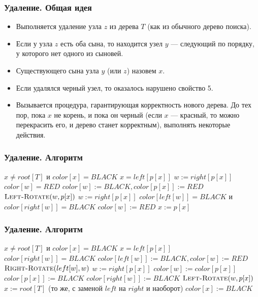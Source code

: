 \documentclass[hyperref={unicode=true}]{beamer}
\begin{document}
\frame
{
  \frametitle{Удаление. Общая идея}
  \begin{itemize}
    \item Выполняется удаление узла $z$ из дерева $T$ (как из обычного дерево поиска).
    \item Если у узла $z$ есть оба сына, то находится узел $y$ --- следующий по порядку, у которого нет одного из сыновей.
    \item Существующего сына узла $y$ (или $z$) назовем $x$.
    \item Если удалялся черный узел, то оказалось нарушено свойство 5.
    \item Вызывается процедура, гарантирующая корректность нового дерева. До тех пор, пока $x$ не корень, и пока он черный (если $x$ --- красный, то можно перекрасить его, и дерево станет корректным), выполнять некоторые действия.
  \end{itemize}
}

\frame
{
  \frametitle{Удаление. Алгоритм}
  \begin{codebox}
      \li \While $x \ne root[T]$ и $color[x] = BLACK$ 
      \li \Do \If $x = left[p[x]]$
      \li \Then $w := right[p[x]]$
      \li \If $color[w] = RED$
      \li \Then $color[w] :=  BLACK, color[p[x]] := RED$ 
      \li       $\textnormal{\scshape Left-Rotate}(w, p[x])$
      \li       $w := right[p[x]]$ \End
      \li \If $color[left[w]] = BLACK$ и $color[right[w]] = BLACK$
      \li   \Then $color[w] := RED$
      \li         $x := p[x]$ \End
  
  \end{codebox}
}

\frame
{
  \frametitle{Удаление. Алгоритм}
  \begin{codebox}
      \li \While $x \ne root[T]$ и $color[x] = BLACK$ 
      \li \Do \If $x = left[p[x]]$
      \li \Then \Else \If $color[right[w]] = BLACK$
      \li \Then $color[left[w]] :=  BLACK, color[w] := RED$ 
      \li       $\textnormal{\scshape Right-Rotate}(left[w], w)$
      \li       $w := right[p[x]]$ \End
      \li   $color[w] := color[p[x]]$
      \li   $color[p[x]] := BLACK$
      \li   $color[right[w]] := BLACK$
      \li   $\textnormal{\scshape Left-Rotate}(w, p[x])$
      \li   $x := root[T]$
      \li   \Else (то же, с заменой $left$ на $right$ и наоборот) \End \End
      \li $color[x] := BLACK$
  
  \end{codebox}
}
\end{document}
